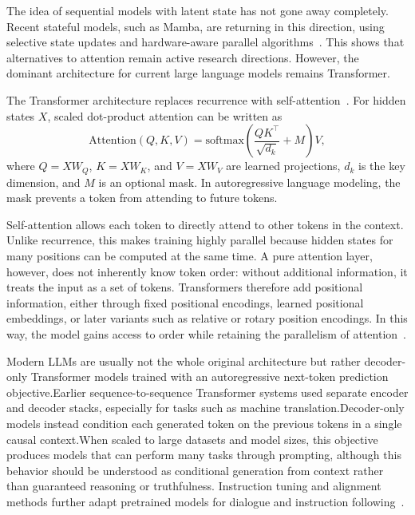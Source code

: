 The idea of sequential models with latent state has not gone away completely. Recent stateful models, such as Mamba, are returning in this direction, using selective state updates and hardware-aware parallel algorithms~\cite{gu_mamba_2023}. This shows that alternatives to attention remain active research directions. However, the dominant architecture for current large language models remains Transformer.

The Transformer architecture replaces recurrence with self-at\-ten\-tion~\cite{vaswani2023attentionneed}. For hidden states \(X\), scaled dot-product attention can be written as
\[
\mathrm{Attention}(Q,K,V)
=
\mathrm{softmax}\left(\frac{QK^\top}{\sqrt{d_k}} + M\right)V,
\]
where \(Q=XW_Q\), \(K=XW_K\), and \(V=XW_V\) are learned projections, \(d_k\) is the key dimension, and \(M\) is an optional mask. In autoregressive language modeling, the mask prevents a token from attending to future tokens.

Self-attention allows each token to directly attend to other tokens in the context. Unlike recurrence, this makes training highly parallel because hidden states for many positions can be computed at the same time. A pure attention layer, however, does not inherently know token order: without additional information, it treats the input as a set of tokens. Transformers therefore add positional information, either through fixed positional encodings, learned positional embeddings, or later variants such as relative or rotary position encodings. In this way, the model gains access to order while retaining the parallelism of attention~\cite{vaswani2023attentionneed}.

Modern LLMs are usually not the whole original architecture but rather decoder-only Transformer models trained with an autoregressive next-token prediction objective.\@ Earlier sequence-to-sequence Transformer systems used separate encoder and decoder stacks, especially for tasks such as machine translation.\@ Decoder-only models instead condition each generated token on the previous tokens in a single causal context.\@ When scaled to large datasets and model sizes, this objective produces models that can perform many tasks through prompting, although this behavior should be understood as conditional generation from context rather than guaranteed reasoning or truthfulness. Instruction tuning and alignment methods further adapt pretrained models for dialogue and instruction following~\cite{ouyang2022traininglanguagemodelsfollow}.

